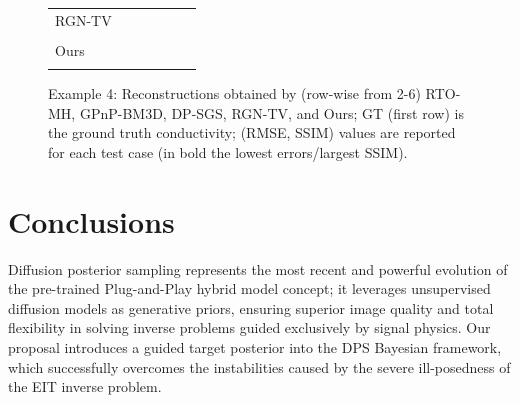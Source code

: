 \documentclass[a4paper,11pt]{article}
\theoremstyle{definition}
\theoremstyle{plain}
\theoremstyle{remark}
\begin{document}
\begin{figure}
\begin{table}[H]
\begin{adjustbox}{width=\linewidth}
\begin{tabular}{C{2.8cm} C{2.8cm} C{2.8cm} C{2.8cm} C{2.8cm} C{2.8cm}}
RGN-TV~\cite{borsic2009vivo} & & & & &\\
 &
 &
 &
&
 &
\\[20mm]

Ours & & & & &\\
 &
 &
 &
&
 &
 \\
\end{tabular}
\end{adjustbox}
\end{table}
\caption{Example 4: Reconstructions obtained by (row-wise from 2-6) RTO-MH, GPnP-BM3D, DP-SGS, RGN-TV, and Ours; GT (first row) is the ground truth conductivity; (RMSE, SSIM) values are reported for each test case (in bold the lowest errors/largest SSIM).}
\label{tab:comp}
\end{figure}

\section{Conclusions}
\label{sec:concl}
 Diffusion posterior sampling represents the most recent and powerful evolution of the pre-trained Plug-and-Play hybrid model concept; it leverages unsupervised diffusion models as generative priors, ensuring superior image quality and total flexibility in solving inverse problems guided exclusively by signal physics. Our proposal introduces a guided target posterior into the DPS Bayesian framework, which successfully overcomes the instabilities caused by the severe ill-posedness of the EIT inverse problem.
 
\end{document}

